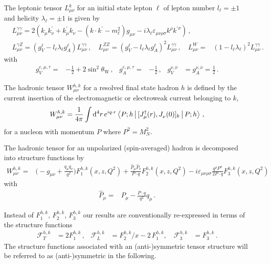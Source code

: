 \documentclass[11pt,a4paper]{article}
\newcommand{\Fcal}{\mathcal{F}}
\newcommand{\dd}{\mathrm{d}}
\begin{document}
The leptonic tensor $L_{\mu\nu}^{k}$ for an initial state lepton $\ell$ of lepton number $l_{\ell}=\pm 1$ and helicity $\lambda_{\ell}=\pm 1$ is given by
\begin{align}
& L_{\mu\nu}^{\gamma\gamma} = 2\left( k_\mu^{\phantom{\prime}} k_\nu^\prime + k_\mu^\prime k_\nu^{\phantom{\prime}} - (k\cdot k^\prime - m_\ell^2) g_{\mu\nu}^{\phantom{\prime}} - i \lambda_{\ell} \varepsilon_{\mu\nu\rho\sigma}^{\phantom{\prime}}k^\rho k^{\prime \sigma}\right)\, , \nonumber \\
& L_{\mu\nu}^{\gamma Z} = \left( g_V^\ell - l_{\ell} \lambda_{\ell} g_A^\ell \right) L_{\mu\nu}^{\gamma\gamma} \,
 , \quad L_{\mu\nu}^{ZZ} = (g_V^\ell - l_{\ell} \lambda_{\ell} g_A^\ell)^2 L_{\mu\nu}^{\gamma\gamma} \, , \quad
L_{\mu\nu}^{W} =& (1 - l_{\ell}\lambda_{\ell})^2 L_{\mu\nu}^{\gamma\gamma} \, .
\end{align}
with
\begin{align}
g_V^{e,\mu,\tau} =& -\frac{1}{2} +2\sin^2\theta_\mathrm{W}\, , &
g_A^{e,\mu,\tau} =& -\frac{1}{2}\, , &
g_V^{\nu,\bar{\nu}} &= g_A^{\nu,\bar{\nu}} = \frac{1}{2} \, .
\end{align}

The hadronic tensor $W_{\mu\nu}^{h,k}$ for a resolved final state hadron $h$ is defined by the current insertion of the electromagnetic or electroweak current belonging to $k$,
\begin{align}
W^{h,k}_{\mu\nu} = \frac{1}{4\pi} \int \dd^4r \, e^{iq\cdot r} \Braket{P;h | [J_\mu^\dagger (r), J_\nu^{\phantom{\dagger}}(0)]_k | P;h} \, ,
\end{align}
for a nucleon with momentum $P$ where $P^2=M_{N}^{2}$.

The hadronic tensor for an unpolarized (spin-averaged) hadron
is decomposed into structure functions by~\cite{ParticleDataGroup:2024cfk,deFlorian:2012wk}
\begin{align}
W_{\mu \nu}^{h,k} =& \bigg(-g_{\mu \nu} + \frac{q_\mu q_\nu}{q^2}\bigg) F_1^{h,k}(x,z,Q^2) + \frac{\hat{P}_\mu \hat{P}_\nu}{P\cdot q} F_2^{h,k}(x,z,Q^2) - i \varepsilon_{\mu\nu\rho\sigma} \frac{q^{\rho} P^\sigma}{2P\cdot q} F_3^{h,k}(x,z,Q^2)
\label{eq:had_tens}
\end{align}
with
\begin{align}
\hat{P}_\mu=& P_\mu - \frac{P\cdot q}{q^2}q_\mu \, .
\end{align}

Instead of $F_1^{h,k}$, $F_2^{h,k}$, $F_3^{h,k}$ our results are conventionally re-expressed in terms of the structure functions
\begin{align}
\Fcal_T^{h,k} &= 2F_1^{h,k} \, , &
\Fcal_L^{h,k} &= F_2^{h,k}/x - 2 \, F_1^{h,k}, \, &
\Fcal_3^{h,k} &= F_3^{h,k} \, .
\end{align}
The structure functions associated with an \mbox{(anti-)symmetric} tensor structure will be referred to as \mbox{(anti-)symmetric} in the following.
\end{document}
